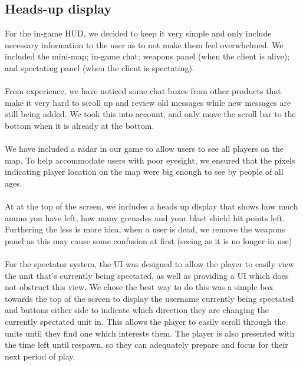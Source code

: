\documentclass[12pt]{article}
\newcommand{\return}{\\\\\noindent}
\begin{document}
\subsection{Heads-up display}
For the in-game HUD, we decided to keep it very simple and only include necessary information to the user as to not make them feel overwhelmed. We included the mini-map; in-game chat; weapons panel (when the client is alive); and spectating panel (when the client is spectating).\return
From experience, we have noticed some chat boxes from other products that make it very hard to scroll up and review old messages while new messages are still being added. We took this into account, and only move the scroll bar to the bottom when it is already at the bottom.\return
We have included a radar in our game to allow users to see all players on the map. To help accommodate users with poor eyesight, we ensured that the pixels indicating player location on the map were big enough to see by people of all ages.\return
At at the top of the screen, we includes a heads up display that shows how much ammo you have left, how many grenades and your blast shield hit points left. Furthering the less is more idea, when a user is dead, we remove the weapons panel as this may cause some confusion at first (seeing as it is no longer in use)\return
For the spectator system, the UI was designed to allow the player to easily view the unit that's currently being spectated, as well as providing a UI which does not obstruct this view. We chose the best way to do this was a simple box towards the top of the screen to display the username currently being spectated and buttons either side to indicate which direction they are changing the currently spectated unit in. This allows the player to easily scroll through the units until they find one which interests them. The player is also presented with the time left until respawn, so they can adequately prepare and focus for their next period of play.
\end{document}
